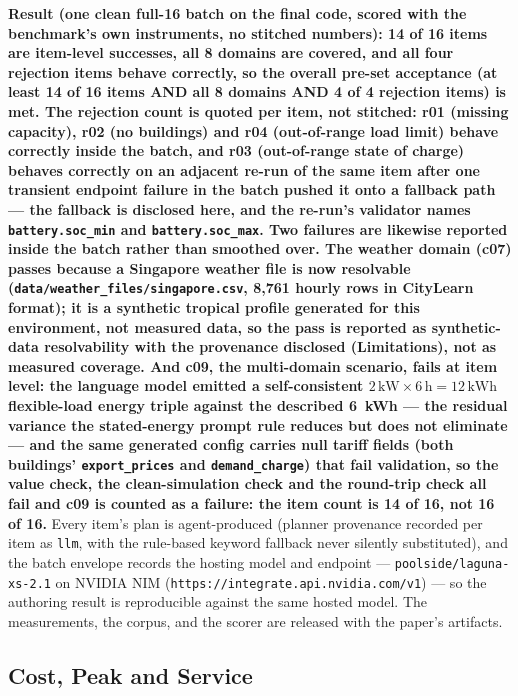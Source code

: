 \documentclass[11pt,a4paper]{article}
\begin{document}
\textbf{Result (one clean full-16 batch on the final code, scored with the
benchmark's own instruments, no stitched numbers): 14 of 16 items are
item-level successes, all 8 domains are covered, and all four rejection
items behave correctly, so the overall pre-set acceptance (at least 14 of 16
items AND all 8 domains AND 4 of 4 rejection items) is met. The rejection
count is quoted per item, not stitched: r01 (missing capacity), r02 (no
buildings) and r04 (out-of-range load limit) behave correctly inside the
batch, and r03 (out-of-range state of charge) behaves correctly on an
adjacent re-run of the same item after one transient endpoint failure in the
batch pushed it onto a fallback path --- the fallback is disclosed here, and
the re-run's validator names \texttt{battery.soc\_min} and
\texttt{battery.soc\_max}. Two failures are likewise reported inside the
batch rather than smoothed over. The weather domain (c07) passes because a
Singapore weather file is now resolvable
(\texttt{data/weather\_files/singapore.csv}, 8{,}761 hourly rows in CityLearn
format); it is a synthetic tropical profile generated for this environment,
not measured data, so the pass is reported as synthetic-data resolvability
with the provenance disclosed (Limitations), not as measured coverage. And
c09, the multi-domain scenario, fails at item level: the language model
emitted a self-consistent
$2\,\mathrm{kW}\times 6\,\mathrm{h}=12\,\mathrm{kWh}$ flexible-load energy
triple against the described 6~kWh --- the residual variance the
stated-energy prompt rule reduces but does not eliminate --- and the same
generated config carries null tariff fields (both buildings'
\texttt{export\_prices} and \texttt{demand\_charge}) that fail validation, so
the value check, the clean-simulation check and the round-trip check all
fail and c09 is counted as a failure: the item count is 14 of 16, not 16 of
16.} Every
item's plan is agent-produced (planner provenance recorded per item as
\texttt{llm}, with the rule-based keyword fallback never silently
substituted), and the batch envelope records the hosting model and endpoint
--- \texttt{poolside/laguna-xs-2.1} on NVIDIA NIM
(\texttt{https://integrate.api.nvidia.com/v1}) --- so the authoring result is
reproducible against the same hosted model. The measurements, the corpus,
and the scorer are released with the paper's artifacts.

\subsection{Cost, Peak and Service}
\label{sec:costpeak}
\end{document}
